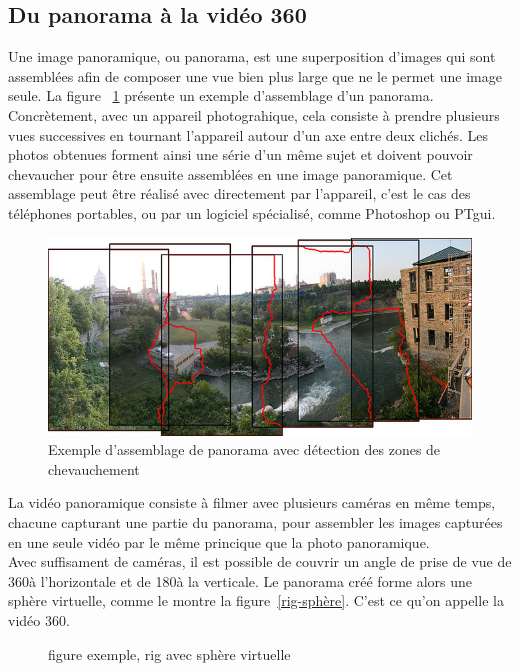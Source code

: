 \subsection{Du panorama à la vidéo 360}
Une image panoramique, ou panorama, est une superposition d'images qui sont assemblées
afin de composer une vue bien plus large que ne le permet une image seule. La figure~ 
\ref{RochesterNY} présente un exemple d'assemblage d'un panorama.\\
Concrètement, avec un appareil photograhique, cela consiste à prendre plusieurs vues
successives en tournant l'appareil autour d'un axe entre deux clichés. 
Les photos obtenues forment ainsi une série d'un même sujet et doivent pouvoir chevaucher 
pour être ensuite assemblées en une image panoramique. 
Cet assemblage peut être réalisé avec directement par l'appareil, c'est le cas des 
téléphones portables, ou par un logiciel spécialisé, comme Photoshop\cite{photomerge} 
ou PTgui\cite{PTgui}.
\begin{figure}
  \centering
  \includegraphics[width=12cm]{images/RochesterNY.jpg}
  \caption{Exemple d'assemblage de panorama avec détection des zones de chevauchement\cite{RochesterNY}}
  \label{RochesterNY}
\end{figure}
\newline
La vidéo panoramique consiste à filmer avec plusieurs caméras en même temps, chacune
capturant une partie du panorama, pour assembler les images capturées en une seule
vidéo par le même princique que la photo panoramique.\\
Avec suffisament de caméras, il est possible de couvrir un angle de prise de vue 
de 360\degree à l'horizontale et de 180\degree à la verticale. Le panorama créé
forme alors une sphère virtuelle, comme le montre la figure~\ref{rig-sphère}. 
C'est ce qu'on appelle la vidéo 360.
\begin{figure}
  \centering
  figure exemple, rig avec sphère virtuelle
\end{figure}
\newline
